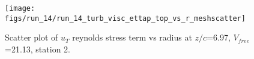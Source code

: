 \begin{figure}[H]
\centering
\texttt{[image: figs/run\_14/run\_14\_turb\_visc\_ettap\_top\_vs\_r\_meshscatter]}
\caption{Scatter plot of $
u_T$ reynolds stress term vs radius at $z/c$=6.97, $V_{free}$=21.13, station 2.}
\label{fig:run_14_turb_visc_ettap_top_vs_r_meshscatter}
\end{figure}


